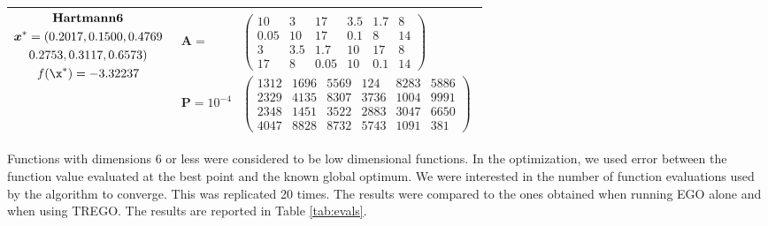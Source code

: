 \documentclass [PhD] {package/uclathes}
\begin{document}
\begin{table}
{\begin{tabular}{|c|c|}
        \hline
         $\begin{gathered}\text { \textbf{Hartmann6 }} \\ \boldsymbol{x}^*=(0.2017,0.1500,0.4769\\ 0.2753,0.3117,0.6573) \\ f(\x^*)=-3.32237\end{gathered}$ &
           $\begin{aligned}  \boldsymbol{A}=&\left(\begin{array}{cccccc}10 & 3 & 17 & 3.5 & 1.7 & 8 \\ 0.05 & 10 & 17 & 0.1 & 8 & 14 \\ 3 & 3.5 & 1.7 & 10 & 17 & 8 \\ 17 & 8 & 0.05 & 10 & 0.1 & 14\end{array}\right) \\  \boldsymbol{P}=10^{-4}&\left(\begin{array}{cccccc}1312 & 1696 & 5569 & 124 & 8283 & 5886 \\ 2329 & 4135 & 8307 & 3736 & 1004 & 9991 \\ 2348 & 1451 & 3522 & 2883 & 3047 & 6650 \\ 4047 & 8828 & 8732 & 5743 & 1091 & 381\end{array}\right)\end{aligned}$\\
           \hline
    \end{tabular}
    }
\end{table}

Functions with dimensions 6 or less were considered to be low dimensional functions. In the optimization, we used error between the function value evaluated at the best point and the known global optimum. We were interested in the number of function evaluations used by the algorithm to converge. This was replicated 20 times. The results were compared to the ones obtained when running EGO alone and when using TREGO. The results are reported in Table \ref{tab:evals}.
\end{document}
